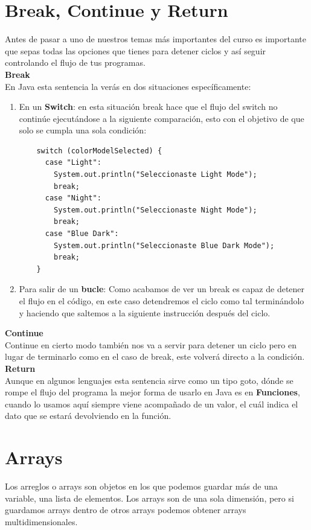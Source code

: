 \documentclass{article}
\begin{document}
\section{Break, Continue y Return}%
Antes de pasar a uno de nuestros temas más importantes del curso es importante
que sepas todas las opciones que tienes para detener ciclos y así seguir
controlando el flujo de tus programas.\\

\textbf{Break}\\
En Java esta sentencia la verás en dos situaciones específicamente:
\begin{enumerate}
  \item En un \textbf{Switch}: en esta situación break hace que el flujo del
    switch no continúe ejecutándose a la siguiente comparación, esto con el
    objetivo de que solo se cumpla una sola condición:

  \begin{verbatim}
    switch (colorModelSelected) {
      case "Light":
        System.out.println("Seleccionaste Light Mode");
        break;
      case "Night":
        System.out.println("Seleccionaste Night Mode");
        break;
      case "Blue Dark":
        System.out.println("Seleccionaste Blue Dark Mode");
        break;
    }
  \end{verbatim}

  \item Para salir de un \textbf{bucle}: Como acabamos de ver un break es capaz
    de detener el flujo en el código, en este caso detendremos el ciclo como
    tal terminándolo y haciendo que saltemos a la siguiente instrucción después
    del ciclo.
\end{enumerate}

\textbf{Continue}\\
Continue en cierto modo también nos va a servir para detener un ciclo pero en
lugar de terminarlo como en el caso de break, este volverá directo a la
condición.\\

\textbf{Return}\\
Aunque en algunos lenguajes esta sentencia sirve como un tipo goto, dónde se
rompe el flujo del programa la mejor forma de usarlo en Java es en
\textbf{Funciones}, cuando lo usamos aquí siempre viene acompañado de un valor,
el cuál indica el dato que se estará devolviendo en la función.


\section{Arrays}%
Los arreglos o arrays son objetos en los que podemos guardar más de una
variable, una lista de elementos. Los arrays son de una sola dimensión, pero si
guardamos arrays dentro de otros arrays podemos obtener arrays
multidimensionales.\\
\end{document}
